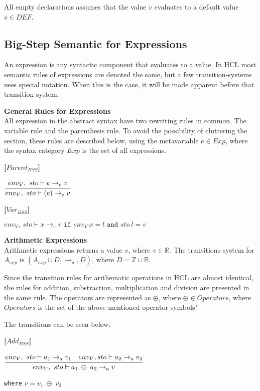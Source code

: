 All empty declarations assumes that the value $v$ evaluates to a default value $v \in DEF$.

\subsection{Big-Step Semantic for Expressions}
An expression is any syntactic component that evaluates to a value.
In HCL most semantic rules of expressions are denoted the same, but a few transition-systems uses special notation.
When this is the case, it will be made apparent before that transition-system.

\textbf{\large{General Rules for Expressions}} \\
All expression in the abstract syntax have two rewriting rules in common.
The variable rule and the parenthesis rule.
To avoid the possibility of cluttering the section, these rules are described below, using the metavariable $e \in Exp$, where the syntax category $Exp$ is the set of all expressions.

\textbf{[$Parent_{BSS}$]}
\begin{center}
	\begin{math}
	\cfrac
		{env_V,\ sto \vdash e \rightarrow_e v}
		{env_V,\ sto \vdash (e) \rightarrow_e v}
	\end{math}
\end{center}

\textbf{[$Var_{BSS}$]}
\begin{center}
	\begin{math}
	env_V,\ sto \vdash x \rightarrow_e v
	\texttt{ if } env_V\ x = l
	\texttt{ and } sto\ l = v
	\end{math}
\end{center}

\textbf{\large{Arithmetic Expressions}}\\
Arithmetic expressions returns a value $v$, where $v \in \mathbb{R}$.
The transitions-system for $A_{exp}$ is $(A_{exp} \cup D, \rightarrow_a, D)$, 
where $D = \mathbb{Z} \cup \mathbb{R}$.

Since the transition rules for arithematic operations in HCL are almost identical, the rules for addition, substraction, multiplication and division are presented in the same rule. 
The operators are represented as $\oplus$, where $\oplus \in Operators$, where $Operators$ is the set of the above mentioned operator symbols"

The transitions can be seen below.

\textbf{[$Add_{BSS}$]}
\begin{center}
	\begin{math}
	\cfrac
		{env_V,\ sto \vdash a_1 \rightarrow_a v_1 \quad env_V, sto \vdash a_2 \rightarrow_a v_2}
		{env_V,\ sto \vdash a_1 \: \oplus \; a_2 \rightarrow_a v}
	\end{math}
		
	\texttt{where} $v = v_1 \: \oplus \; v_2$
\end{center}

